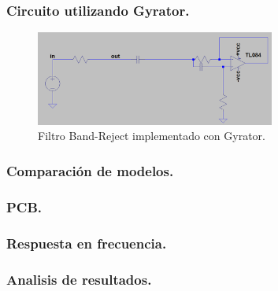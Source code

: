 \documentclass[a4paper]{article}
\begin{document}
\subsubsection{Circuito utilizando Gyrator.}
\begin{figure}[H]	
	\centering
	\includegraphics[width=0.7\textwidth]{gyrBR.PNG}
	\caption{Filtro Band-Reject implementado con Gyrator.}
	\label{fig:gyrBR}
\end{figure}

\subsubsection{Comparación de modelos.}
\subsubsection{PCB.}
\subsubsection{Respuesta en frecuencia.}
\subsubsection{Analisis de resultados.}
\end{document}
